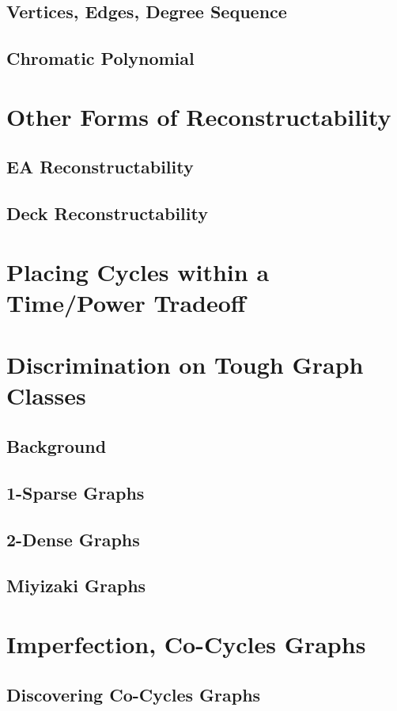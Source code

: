 \documentclass[11pt,a4paper]{report}
\begin{document}
\subsection{Vertices, Edges, Degree Sequence}
\subsection{Chromatic Polynomial}

\section{Other Forms of Reconstructability}
\subsection{EA Reconstructability}
\subsection{Deck Reconstructability}

\section{Placing Cycles within a Time/Power Tradeoff}

\section{Discrimination  on Tough Graph Classes}
\subsection{Background}
\subsection{1-Sparse Graphs}
\subsection{2-Dense Graphs}
\subsection{Miyizaki Graphs}

\section{Imperfection, Co-Cycles Graphs}
\subsection{Discovering Co-Cycles Graphs}
\end{document}
